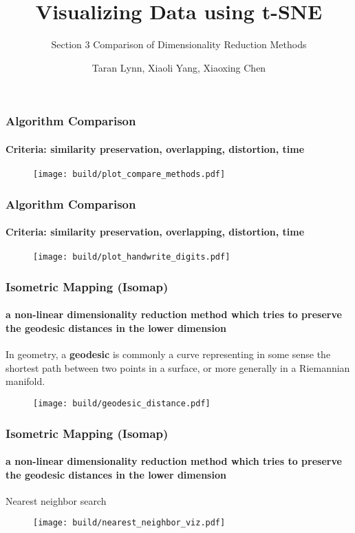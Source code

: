 \documentclass{beamer}
\title{Visualizing Data using t-SNE}
\subtitle{Section 3 Comparison of Dimensionality Reduction Methods}
\author{Taran Lynn, Xiaoli Yang, Xiaoxing Chen}
\begin{document}
\maketitle


% 
% 
% 
% 
% 
%
\begin{frame}
  \frametitle{Algorithm Comparison}
  \framesubtitle{Criteria: similarity preservation, overlapping, distortion, time}
  \begin{figure}
    \centering
    \texttt{[image: build/plot\_compare\_methods.pdf]}
  \end{figure}
  \end{frame}
  
  \begin{frame}
    \frametitle{Algorithm Comparison}
    \framesubtitle{Criteria: similarity preservation, overlapping, distortion, time}
    \begin{figure}
      \centering
      \texttt{[image: build/plot\_handwrite\_digits.pdf]}
    \end{figure}
  \end{frame}

% 
% 
% 
%

\begin{frame}
  \frametitle{Isometric Mapping (Isomap)}
  \framesubtitle{a non-linear dimensionality reduction method which tries to preserve the geodesic distances in the lower dimension}

  In geometry, a \textbf{geodesic} is commonly a curve representing in some sense the shortest path 
  between two points in a surface, or more generally in a Riemannian manifold.
  \begin{figure}
    \centering
    \texttt{[image: build/geodesic\_distance.pdf]}
  \end{figure}

\end{frame}

\begin{frame}
  \frametitle{Isometric Mapping (Isomap)}
  \framesubtitle{a non-linear dimensionality reduction method which tries to preserve the geodesic distances in the lower dimension}

  Nearest neighbor search
  \begin{figure}
    \centering
    \texttt{[image: build/nearest\_neighbor\_viz.pdf]}
  \end{figure}

\end{frame}
\end{document}
